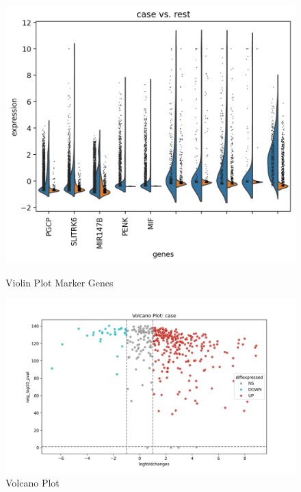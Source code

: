 \begin{figure}[!htb]
  \centering
  \begin{minipage}[t]{0.46\textwidth}
    \centering
    \includegraphics[width=\textwidth]{images/Marker_Genes_Violin.png}
    \caption*{\small \foreignlanguage{english}{Violin Plot Marker Genes}}
  \end{minipage}
  \hfill
  \begin{minipage}[t]{0.60\textwidth}
    \centering
    \includegraphics[width=\textwidth]{images/Volcano_Plot.png}
    \caption*{\small \foreignlanguage{english}{Volcano Plot}}
  \end{minipage}
\end{figure}